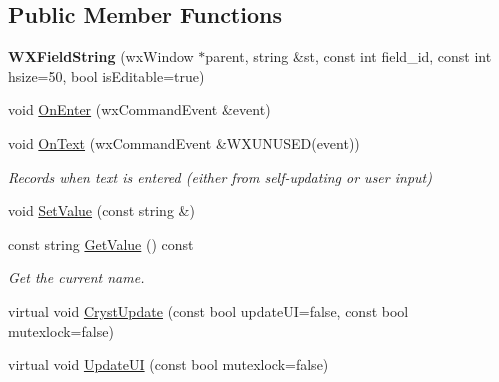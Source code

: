 \subsection*{Public Member Functions}
\begin{DoxyCompactItemize}
\item 
\mbox{\label{class_obj_cryst_1_1_w_x_field_string_ac4c30cbc2b61cd29f864e8b6853474d4}} 
{\bfseries W\+X\+Field\+String} (wx\+Window $\ast$parent, string \&st, const int field\+\_\+id, const int hsize=50, bool is\+Editable=true)
\item 
void \mbox{\hyperlink{class_obj_cryst_1_1_w_x_field_string_a4ab041e7f333884f0bfb8371699a47ad}{On\+Enter}} (wx\+Command\+Event \&event)
\item 
\mbox{\label{class_obj_cryst_1_1_w_x_field_string_a0c9a4f6f2c3c1082ba3aff0fa55d19f3}} 
void \mbox{\hyperlink{class_obj_cryst_1_1_w_x_field_string_a0c9a4f6f2c3c1082ba3aff0fa55d19f3}{On\+Text}} (wx\+Command\+Event \&W\+X\+U\+N\+U\+S\+ED(event))
\begin{DoxyCompactList}\small\item\em Records when text is entered (either from self-\/updating or user input) \end{DoxyCompactList}\item 
void \mbox{\hyperlink{class_obj_cryst_1_1_w_x_field_string_a26889c2974269016abf0ed81c860ca29}{Set\+Value}} (const string \&)
\item 
\mbox{\label{class_obj_cryst_1_1_w_x_field_string_a4bfc68e332e7c21d59883606073d0fe1}} 
const string \mbox{\hyperlink{class_obj_cryst_1_1_w_x_field_string_a4bfc68e332e7c21d59883606073d0fe1}{Get\+Value}} () const
\begin{DoxyCompactList}\small\item\em Get the current name. \end{DoxyCompactList}\item 
virtual void \mbox{\hyperlink{class_obj_cryst_1_1_w_x_field_string_acac0d32e4560531e1cab6af0071bb55f}{Cryst\+Update}} (const bool update\+UI=false, const bool mutexlock=false)
\item 
virtual void \mbox{\hyperlink{class_obj_cryst_1_1_w_x_field_string_ae5d38d52534a9ccbc0f9c030fc447332}{Update\+UI}} (const bool mutexlock=false)
\item 

\end{DoxyCompactItemize}
